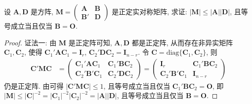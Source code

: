 \documentclass[../../main.tex]{subfiles}
\begin{document}
\begin{proposition}\label{proposition:正定分块阵的行列式相关不等式}
设 \(\boldsymbol{A},\boldsymbol{D}\) 是方阵, \(\boldsymbol{M}=\begin{pmatrix}\boldsymbol{A}&\boldsymbol{B}\\\boldsymbol{B}'&\boldsymbol{D}\end{pmatrix}\) 是正定实对称矩阵, 求证: \(|\boldsymbol{M}|\leq|\boldsymbol{A}||\boldsymbol{D}|\), 且等号成立当且仅当 \(\boldsymbol{B}=\boldsymbol{O}\).
\end{proposition}
\begin{proof}
{\color{blue}证法一:}
由 \(\boldsymbol{M}\) 是正定阵可知, \(\boldsymbol{A},\boldsymbol{D}\) 都是正定阵, 从而存在非异实矩阵 \(\boldsymbol{C}_1,\boldsymbol{C}_2\), 使得 \(\boldsymbol{C}_1'\boldsymbol{A}\boldsymbol{C}_1=\boldsymbol{I}_r\), \(\boldsymbol{C}_2'\boldsymbol{D}\boldsymbol{C}_2=\boldsymbol{I}_{n - r}\). 令 \(\boldsymbol{C}=\text{diag}\{\boldsymbol{C}_1,\boldsymbol{C}_2\}\), 则
\begin{align*}
\boldsymbol{C}'\boldsymbol{M}\boldsymbol{C}&=\begin{pmatrix}\boldsymbol{C}_1'\boldsymbol{A}\boldsymbol{C}_1&\boldsymbol{C}_1'\boldsymbol{B}\boldsymbol{C}_2\\\boldsymbol{C}_2'\boldsymbol{B}'\boldsymbol{C}_1&\boldsymbol{C}_2'\boldsymbol{D}\boldsymbol{C}_2\end{pmatrix}=\begin{pmatrix}\boldsymbol{I}_r&\boldsymbol{C}_1'\boldsymbol{B}\boldsymbol{C}_2\\\boldsymbol{C}_2'\boldsymbol{B}'\boldsymbol{C}_1&\boldsymbol{I}_{n - r}\end{pmatrix}
\end{align*}
仍是正定阵. 由可得 \(|\boldsymbol{C}'\boldsymbol{M}\boldsymbol{C}|\leq1\), 且等号成立当且仅当 \(\boldsymbol{C}_1'\boldsymbol{B}\boldsymbol{C}_2=\boldsymbol{O}\), 即 \(|\boldsymbol{M}|\leq|\boldsymbol{C}|^{-2}=|\boldsymbol{C}_1|^{-2}|\boldsymbol{C}_2|^{-2}=|\boldsymbol{A}||\boldsymbol{D}|\), 且等号成立当且仅当 \(\boldsymbol{B}=\boldsymbol{O}\). 


\end{proof}
\end{document}
